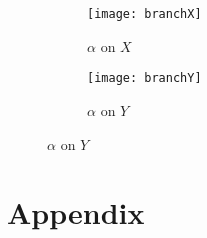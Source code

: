 \documentclass[]{article}
\begin{document}
\begin{figure}[H]
	\begin{subfigure}{.4\textwidth}
		\texttt{[image: branchX]}
		\caption{$ \alpha $ on $ X $}
	\end{subfigure}
	\begin{subfigure}{.5\textwidth}
		\texttt{[image: branchY]}
				\caption{$ \alpha $ on $ Y $}
	\end{subfigure}
\end{figure}

\section*{Appendix}














\end{document}
